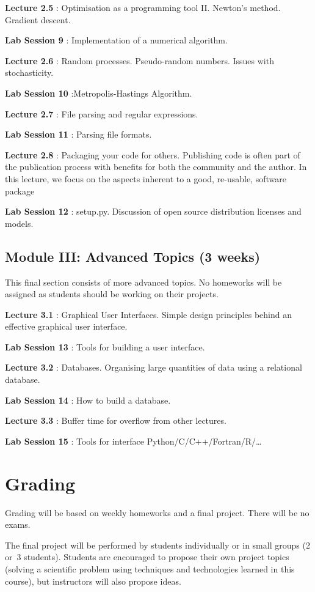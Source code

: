 \documentclass{article}
\newcommand*{\Lecture}[1]{%
{\bf #1}%
}
\begin{document}
\Lecture{Lecture 2.5}: Optimisation as a programming tool II. Newton's method. Gradient descent.

\Lecture{Lab Session 9}: Implementation of a numerical algorithm.

\Lecture{Lecture 2.6}: Random processes. Pseudo-random numbers. Issues with stochasticity.

\Lecture{Lab Session 10}:Metropolis-Hastings Algorithm.

\Lecture{Lecture 2.7}: File parsing and regular expressions.

\Lecture{Lab Session 11}: Parsing file formats.

\Lecture{Lecture 2.8}: Packaging your code for others. Publishing code is often part of the publication process with benefits for both the community and the author. In this lecture, we focus on the aspects inherent to a good, re-usable, software package

\Lecture{Lab Session 12}: setup.py. Discussion of open source distribution licenses and models.

\subsection{Module III: Advanced Topics (3 weeks)}

This final section consists of more advanced topics. No homeworks will be assigned as students should be working on their projects.

\Lecture{Lecture 3.1}: Graphical User Interfaces. Simple design principles behind an effective graphical user interface.

\Lecture{Lab Session 13}: Tools for building a user interface.

\Lecture{Lecture 3.2}: Databases. Organising large quantities of data using a relational database.

\Lecture{Lab Session 14}: How to build a database.

\Lecture{Lecture 3.3}: Buffer time for overflow from other lectures.

\Lecture{Lab Session 15}: Tools for interface Python/C/C++/Fortran/R/\dots

\section{Grading}

Grading will be based on weekly homeworks and a final project. There will be no exams.

The final project will be performed by students individually or in small groups (2 or~3 students). Students are encouraged to propose their own project topics (solving a scientific problem using techniques and technologies learned in this course), but instructors will also propose ideas.
\end{document}
